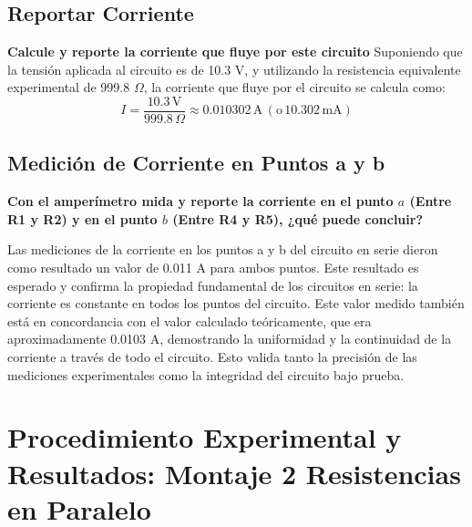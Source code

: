 \subsection{Reportar Corriente}
\textbf{Calcule y reporte la corriente que fluye por este circuito}
Suponiendo que la tensión aplicada al circuito es de 10.3 V, y utilizando la resistencia equivalente experimental de 999.8 \(\Omega\), la corriente que fluye por el circuito se calcula como:
\[
I = \frac{10.3 \, \text{V}}{999.8 \, \Omega} \approx 0.010302 \, \text{A} \, (\text{o} \, 10.302 \, \text{mA})
\]

\subsection{Medición de Corriente en Puntos a y b}
\textbf{Con el amperímetro mida y reporte la corriente en el punto $a$ (Entre R1 y R2) y en el punto $b$ (Entre R4 y R5), ¿qué puede concluir?}

Las mediciones de la corriente en los puntos a y b del circuito en serie dieron como resultado un valor de 0.011 A para ambos puntos. Este resultado es esperado y confirma la propiedad fundamental de los circuitos en serie: la corriente es constante en todos los puntos del circuito. Este valor medido también está en concordancia con el valor calculado teóricamente, que era aproximadamente 0.0103 A, demostrando la uniformidad y la continuidad de la corriente a través de todo el circuito. Esto valida tanto la precisión de las mediciones experimentales como la integridad del circuito bajo prueba.

\section{Procedimiento Experimental y Resultados: Montaje 2 Resistencias en Paralelo}

